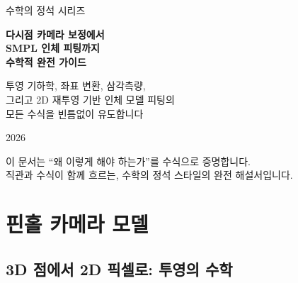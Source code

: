 \documentclass[11pt, a4paper]{report}
\theoremstyle{definition}
\theoremstyle{remark}
\begin{document}
\begin{titlepage}
\centering
\vspace*{1.5cm}
{\Large\color{gray} 수학의 정석 시리즈}
\vspace{0.5cm}

{\Huge\bfseries\color{defblue} 다시점 카메라 보정에서\\[0.3cm]
SMPL 인체 피팅까지\\[0.3cm]
수학적 완전 가이드}

\vspace{1cm}

{\LARGE\color{defblue!70!black} 투영 기하학, 좌표 변환, 삼각측량,\\
그리고 2D 재투영 기반 인체 모델 피팅의\\
모든 수식을 빈틈없이 유도합니다}

\vspace{3cm}
{\large 2026}

\vspace{\fill}
{\small\color{gray} 이 문서는 ``왜 이렇게 해야 하는가''를 수식으로 증명합니다.\\
직관과 수식이 함께 흐르는, 수학의 정석 스타일의 완전 해설서입니다.}
\end{titlepage}

\tableofcontents
\newpage


\chapter{핀홀 카메라 모델}
\label{ch:pinhole}

\section{3D 점에서 2D 픽셀로: 투영의 수학}
\end{document}
